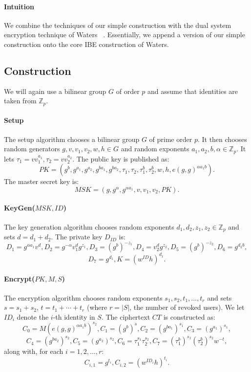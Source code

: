 \documentclass[a4paper, 11pt]{article}
\newcommand{\Z}{\ensuremath{\mathbb{Z}}}
\theoremstyle{definition}
\begin{document}
\paragraph{Intuition} We combine the techniques of our simple construction with the dual system encryption technique of Waters ~\cite{W09}. Essentially, we append a version of our simple construction onto the core IBE construction of Waters.

\subsection{Construction}
We will again use a bilinear group $G$ of order $p$ and assume that identities are taken from $\Z_p$.

\paragraph{Setup} The setup algorithm chooses a bilinear group $G$ of prime order $p$. It then chooses random generators $g, v, v_1, v_2, w, h \in G$ and random exponents $a_1, a_2, b, \alpha \in \Z_p$. It lets $\tau_{1} = v v_1^{a_1}, \tau_2 = v v_2^{a_2}$. The public key is published as:
\[ PK = (g^b, g^{a_1}, g^{a_2}, g^{ba_1}, g^{ba_2}, \tau_1, \tau_2, \tau_1^b, \tau_2^b, w, h, e(g,g)^{\alpha a_1 b}).\]
The master secret key is:
\[ MSK  = (g, g^\alpha, g^{\alpha a_1}, v, v_1, v_2, PK).\]

\paragraph{KeyGen($MSK,ID$)} The key generation algorithm chooses random exponents $d_1, d_2, z_1, z_2 \in \Z_p$ and sets $d = d_1+d_2$. The private key $D_{ID}$ is:
\[D_1 = g^{\alpha a_1}v^d, D_2 = g^{-\alpha}v_1^d g^{z_1}, D_3 = (g^b)^{-z_1}, D_4 = v_2^dg^{z_2}, D_5 = (g^b)^{-z_2}, D_6 = g^{d_2 b},\]
\[D_7 = g^{d_1}, K = (w^{ID}h)^{d_1}.\]

\paragraph{Encrypt($PK, M, S$)} The encryption algorithm chooses random exponents $s_1, s_2, t_1, \ldots, t_r$ and sets $s = s_1 + s_2$, $t = t_1 + \cdots + t_r$ (where $r = |S|$, the number of revoked users). We let $ID_i$ denote the $i$-th identity in $S$. The ciphertext $CT$ is constructed as:
\[ C_0 = M \left(e(g,g)^{\alpha a_1 b}\right)^{s_2}, C_1 = (g^{b})^{s}, C_2 = (g^{b a_1})^{s_1}, C_3 = (g^{a_1})^{s_1}, \]
\[ C_4 = (g^{ba_2})^{s_2}, C_5 = (g^{a_2})^{s_2}, C_6 = \tau_1^{s_1}\tau_2^{s_2}, C_7 = (\tau_1^b)^{s_1}(\tau_2^b)^{s_2} w^{-t},\]
along with, for each $i = 1, 2, \ldots, r$:
\[ C_{i,1} = g^{t_i}, C_{i,2} = (w^{ID_i}h)^{t_i}.\]
\end{document}
